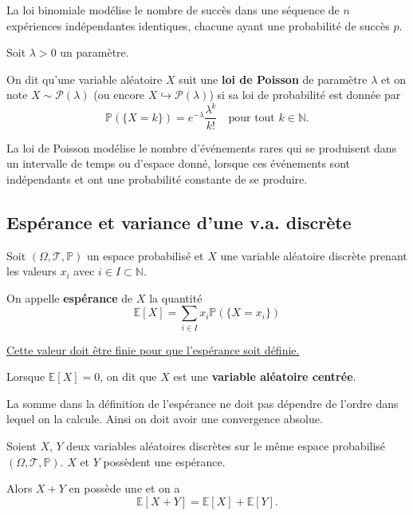 \documentclass[a4paper, 12pt]{article}
\begin{document}
\begin{remarque}
    La loi binomiale modélise le nombre de succès dans une séquence de $n$ expériences indépendantes identiques, chacune ayant une probabilité de succès $p$.
\end{remarque}

\begin{definition}
    Soit $\lambda > 0$ un paramètre.

    On dit qu'une variable aléatoire $X$ suit une \textbf{loi de Poisson} de paramètre $\lambda$ et on note $X \sim \mathcal{P}(\lambda)$ (ou encore $X \hookrightarrow \mathcal{P}(\lambda)$) si sa loi de probabilité est donnée par
    $$
    \mathbb{P}(\{ X = k \}) = e^{-\lambda} \frac{\lambda^k}{k!} \quad \text{pour tout } k \in \mathbb{N}.
    $$
\end{definition}

\begin{remarque}
    La loi de Poisson modélise le nombre d'événements rares qui se produisent dans un intervalle de temps ou d'espace donné, lorsque ces événements sont indépendants et ont une probabilité constante de se produire.
\end{remarque}

\subsection{Espérance et variance d'une v.a. discrète}

\begin{definition}
    Soit $(\Omega, \mathcal{T}, \mathbb{P})$ un espace probabilisé et $X$ une variable aléatoire discrète prenant les valeurs $x_i$ avec $i \in I \subset \mathbb{N}$.

    On appelle \textbf{espérance} de $X$ la quantité
    $$
    \mathbb{E}[X] = \sum_{i \in I} x_i \mathbb{P}(\{ X = x_i \})
    $$

    \underline{Cette valeur doit être finie pour que l'espérance soit définie.}

    Lorsque $\mathbb{E}[X] = 0$, on dit que $X$ est une \textbf{variable aléatoire centrée}.
\end{definition}

\begin{remarque}
    La somme dans la définition de l'espérance ne doit pas dépendre de l'ordre dans lequel on la calcule. Ainsi on doit avoir une convergence absolue.
\end{remarque}

\begin{theoreme}{}{}
    Soient $X$, $Y$ deux variables aléatoires discrètes sur le même espace probabilisé $(\Omega, \mathcal{T}, \mathbb{P})$.
    $X$ et $Y$ possèdent une espérance.

    Alors $X + Y$ en possède une et on a
    $$
    \mathbb{E}[X + Y] = \mathbb{E}[X] + \mathbb{E}[Y].
    $$
\end{theoreme}
\end{document}
